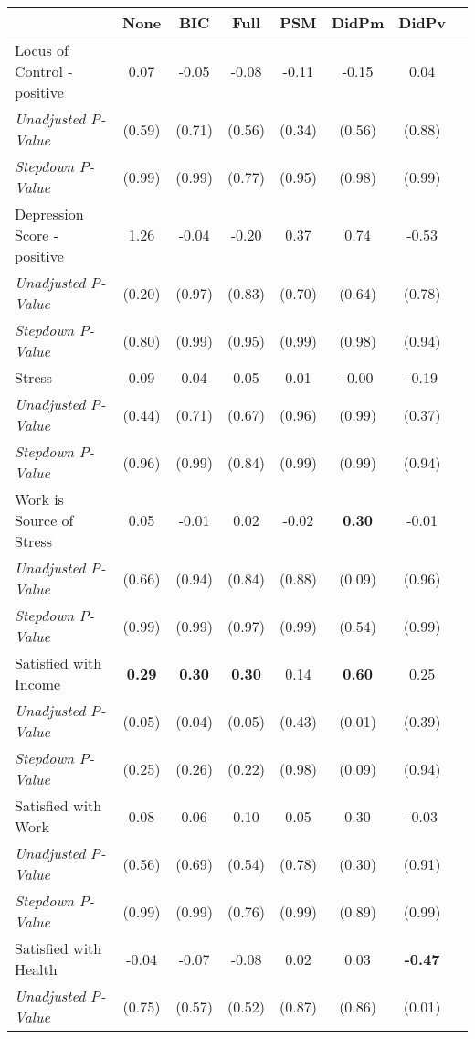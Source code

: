 \begin{tabular}{l c c c c c c c}
\toprule
 & None & BIC & Full & PSM & DidPm & DidPv \\
\midrule
Locus of Control - positive & 0.07 & -0.05 & -0.08 & -0.11 & -0.15 & 0.04 \\
\quad \textit{Unadjusted P-Value} & (0.59) & (0.71) & (0.56) & (0.34) & (0.56) & (0.88) \\
\quad \textit{Stepdown P-Value} & (0.99) & (0.99) & (0.77) & (0.95) & (0.98) & (0.99) \\
Depression Score - positive & 1.26 & -0.04 & -0.20 & 0.37 & 0.74 & -0.53 \\
\quad \textit{Unadjusted P-Value} & (0.20) & (0.97) & (0.83) & (0.70) & (0.64) & (0.78) \\
\quad \textit{Stepdown P-Value} & (0.80) & (0.99) & (0.95) & (0.99) & (0.98) & (0.94) \\
Stress & 0.09 & 0.04 & 0.05 & 0.01 & -0.00 & -0.19 \\
\quad \textit{Unadjusted P-Value} & (0.44) & (0.71) & (0.67) & (0.96) & (0.99) & (0.37) \\
\quad \textit{Stepdown P-Value} & (0.96) & (0.99) & (0.84) & (0.99) & (0.99) & (0.94) \\
Work is Source of Stress & 0.05 & -0.01 & 0.02 & -0.02 & \textbf{ 0.30 } & -0.01 \\
\quad \textit{Unadjusted P-Value} & (0.66) & (0.94) & (0.84) & (0.88) & (0.09) & (0.96) \\
\quad \textit{Stepdown P-Value} & (0.99) & (0.99) & (0.97) & (0.99) & (0.54) & (0.99) \\
Satisfied with Income & \textbf{ 0.29 } & \textbf{ 0.30 } & \textbf{ 0.30 } & 0.14 & \textbf{ 0.60 } & 0.25 \\
\quad \textit{Unadjusted P-Value} & (0.05) & (0.04) & (0.05) & (0.43) & (0.01) & (0.39) \\
\quad \textit{Stepdown P-Value} & (0.25) & (0.26) & (0.22) & (0.98) & (0.09) & (0.94) \\
Satisfied with Work & 0.08 & 0.06 & 0.10 & 0.05 & 0.30 & -0.03 \\
\quad \textit{Unadjusted P-Value} & (0.56) & (0.69) & (0.54) & (0.78) & (0.30) & (0.91) \\
\quad \textit{Stepdown P-Value} & (0.99) & (0.99) & (0.76) & (0.99) & (0.89) & (0.99) \\
Satisfied with Health & -0.04 & -0.07 & -0.08 & 0.02 & 0.03 & \textbf{ -0.47 } \\
\quad \textit{Unadjusted P-Value} & (0.75) & (0.57) & (0.52) & (0.87) & (0.86) & (0.01) \\

\end{tabular}
